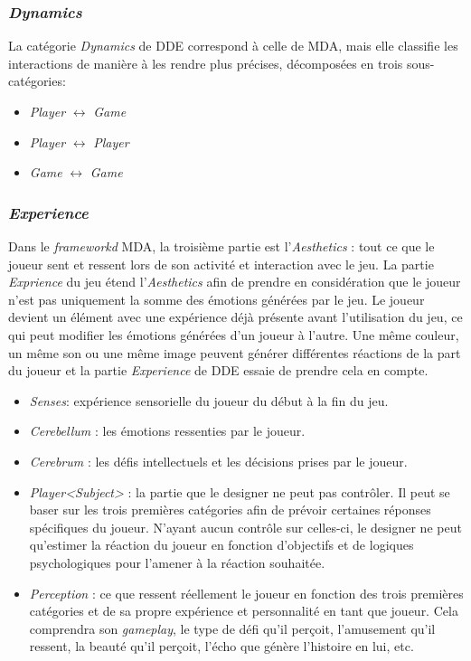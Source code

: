 

\subsubsection{\emph{Dynamics} }
    La catégorie \emph{Dynamics} de DDE correspond à celle de MDA, mais elle classifie les interactions de manière à les rendre plus précises, d\'ecompos\'ees en trois sous-catégories: 
    \begin{itemize}
        \item \emph{Player} $\leftrightarrow$ \emph{Game}
        \item \emph{Player} $\leftrightarrow$ \emph{Player}
        \item \emph{Game} $\leftrightarrow$ \emph{Game}
    \end{itemize}

\subsubsection{\emph{Experience}}
    Dans le \emph{frameworkd} MDA, la troisième partie est l'\emph{Aesthetics} : tout ce que le joueur sent et ressent lors de son activité et interaction avec le jeu. 
    La partie \emph{Exprience} du jeu étend l'\emph{Aesthetics} afin de prendre en considération que le joueur n'est pas uniquement la somme des émotions générées par le jeu. 
    Le joueur devient un élément avec une expérience déjà présente avant l'utilisation du jeu, ce qui peut modifier les émotions générées d'un joueur à l'autre. Une même couleur, un même son ou une même image peuvent générer différentes réactions de la part du joueur et la partie \emph{Experience} de DDE essaie de prendre cela en compte.
    \begin{itemize}
        \item \emph{Senses}: expérience sensorielle du joueur du début à la fin du jeu.
        \item \emph{Cerebellum} : les émotions ressenties par le joueur.
        \item \emph{Cerebrum} : les d\'efis intellectuels et les décisions prises par le joueur.
        \item \emph{Player<Subject>} : la partie que le designer ne peut pas contrôler. Il peut se baser sur les trois premières catégories afin de prévoir certaines réponses spécifiques du joueur. N'ayant aucun contrôle sur celles-ci, le designer ne peut qu'estimer la réaction du joueur en fonction d'objectifs et de logiques psychologiques pour l'amener à la réaction souhaitée.
        \item \emph{Perception} : ce que ressent réellement le joueur en fonction des trois premières catégories et de sa propre expérience et personnalité en tant que joueur. Cela comprendra son \emph{gameplay}, le type de d\'efi qu'il perçoit, l'amusement qu'il ressent, la beauté qu'il perçoit, l'écho que génère l'histoire en lui, etc.
    \end{itemize}


